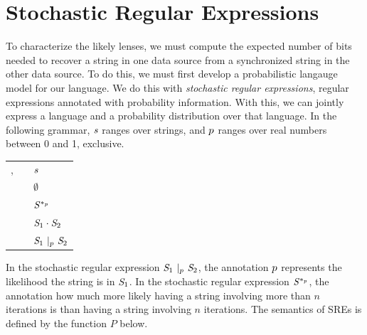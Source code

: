 \documentclass[acmsmall,screen,anonymous]{acmart}
\begin{document}

\section{Stochastic Regular Expressions}
\label{sec:srx}
To characterize the likely lenses, we must compute the expected number of bits
needed to recover a string in one data source from a synchronized string in the
other data source. To do this, we must first develop a probabilistic langauge
model for our language. We do this with \emph{stochastic regular expressions},
regular expressions annotated with probability information. With this, we can
jointly express a language and a probability distribution over that language. In
the following grammar, $\String$ ranges over strings, and $\Probability$ ranges
over real numbers between 0 and 1, exclusive.

\begin{center}
  \begin{tabular}{rcl}
    \Regex{},\RegexAlt{}
    & \GEq{} & $\String$ \\
    & \GBar{} & $\emptyset$ \\
    & \GBar{} & $\PRegexStar{\Regex}{p}$ \\
    & \GBar{} & $\RegexConcat{\Regex_1}{\Regex_2}$ \\
    & \GBar{} & $\PRegexOr{\Regex_1}{\Regex_2}{p}$
  \end{tabular}
\end{center}

In the stochastic regular expression
$\PRegexOr{\Regex_1}{\Regex_2}{\Probability}$, the annotation $\Probability$
represents the likelihood the string is in $\Regex_1$. In the stochastic regular
expression $\PRegexStar{\Regex}{\Probability}$, the annotation \Probability how
much more likely having a string involving more than $n$ iterations is than
having a string involving $n$ iterations. The semantics of SREs is defined by
the function $P$ below.
\end{document}
